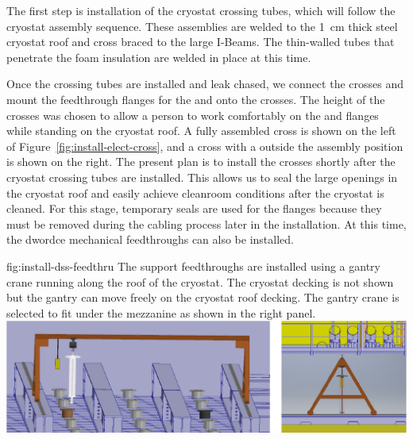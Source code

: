 The first step is installation of the cryostat crossing tubes, which will follow the cryostat assembly sequence.   
These assemblies are welded to the \SI{1}{cm} thick steel cryostat roof and %
cross braced to the large I-Beams. 
The thin-walled tubes that penetrate %
the foam insulation are welded in place at this time. 

Once the crossing tubes are installed and leak chased,  %
we connect the   crosses and mount  the feedthrough flanges for the  and  onto the crosses. 
The height of the crosses was chosen to allow a person to work comfortably on the   and  flanges while standing on the cryostat roof. 
A fully assembled cross is shown on the left of Figure~\ref{fig:install-elect-cross}, and a cross with a  outside the assembly position is shown on the right. 
The present plan is to install the crosses shortly after the cryostat crossing tubes are installed. 
This allows us to seal the large openings in the cryostat roof %
and easily achieve cleanroom conditions %
after the cryostat is cleaned. 
For this stage, temporary seals %
are used for the flanges because they must be removed during the cabling process later in the installation. At this time, the 
dword{ce} mechanical feedthroughs can also be installed. 

\begin{dunefigure}{fig:install-dss-feedthru}
  {The  support feedthroughs are installed using a gantry crane running along the roof of the cryostat. The cryostat decking is not shown %
  but the gantry %
  can move freely on the cryostat roof decking. The gantry crane is selected to fit under the mezzanine as shown in the right panel.}
  \includegraphics[width=.98\textwidth]{graphics/install-dss-feedthru-v2.pdf}
\end{dunefigure}

